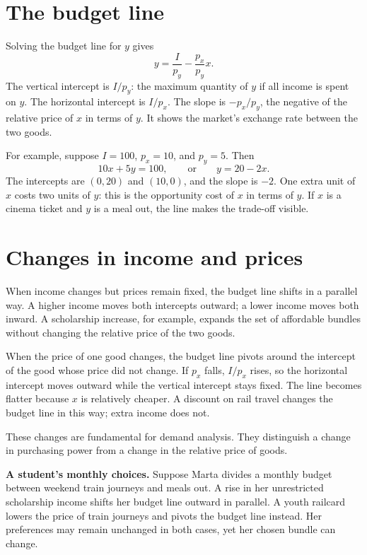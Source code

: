 \section{The budget line}

Solving the budget line for $y$ gives
\[
y=\frac{I}{p_y}-\frac{p_x}{p_y}x.
\]
The vertical intercept is $I/p_y$: the maximum quantity of $y$ if all income
is spent on $y$. The horizontal intercept is $I/p_x$. The slope is
$-p_x/p_y$, the negative of the relative price of $x$ in terms of $y$. It
shows the market's exchange rate between the two goods.

For example, suppose $I=100$, $p_x=10$, and $p_y=5$. Then
\[
10x+5y=100,
\qquad\text{or}\qquad
y=20-2x.
\]
The intercepts are $(0,20)$ and $(10,0)$, and the slope is $-2$. One extra
unit of $x$ costs two units of $y$: this is the opportunity cost of $x$ in
terms of $y$. If $x$ is a cinema ticket and $y$ is a meal out, the line makes
the trade-off visible.

\section{Changes in income and prices}

When income changes but prices remain fixed, the budget line shifts in a
parallel way. A higher income moves both intercepts outward; a lower income
moves both inward. A scholarship increase, for example, expands the set of
affordable bundles without changing the relative price of the two goods.

When the price of one good changes, the budget line pivots around the
intercept of the good whose price did not change. If $p_x$ falls, $I/p_x$
rises, so the horizontal intercept moves outward while the vertical intercept
stays fixed. The line becomes flatter because $x$ is relatively cheaper. A
discount on rail travel changes the budget line in this way; extra income
does not.

These changes are fundamental for demand analysis. They distinguish a change
in purchasing power from a change in the relative price of goods.

\begin{exercisebox}
\textbf{A student's monthly choices.} Suppose Marta divides a monthly budget
between weekend train journeys and meals out. A rise in her unrestricted
scholarship income shifts her budget line outward in parallel. A youth
railcard lowers the price of train journeys and pivots the budget line instead.
Her preferences may remain unchanged in both cases, yet her chosen bundle can
change.
\end{exercisebox}

